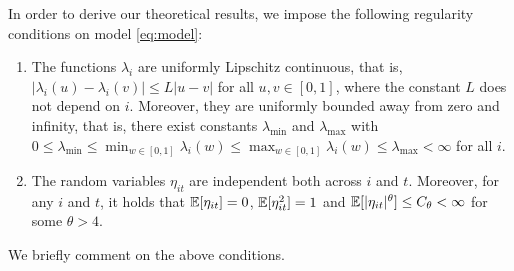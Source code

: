 \documentclass[a4paper,12pt]{article}
\numberwithin{equation}{section}
\begin{document}
In order to derive our theoretical results, we impose the following regularity conditions on model \eqref{eq:model}:
\begin{enumerate}[label=(C\arabic*),leftmargin=1.0cm]
\item \label{C2} The functions $\lambda_i$ are uniformly Lipschitz continuous, that is, $|\lambda_i(u) - \lambda_i(v)| \le L |u-v|$ for all $u, v \in [0,1]$, where the constant $L$ does not depend on $i$. Moreover, they are uniformly bounded away from zero and infinity, that is, there exist constants $\lambda_{\min}$ and $\lambda_{\max}$ with $0 \le \lambda_{\min} \le \min_{w \in [0,1]} \lambda_i(w) \le \max_{w \in [0,1]} \lambda_i(w) \le \lambda_{\max} < \infty$ for all $i$. 
\item \label{C1} The random variables $\eta_{it}$ are independent both across $i$ and $t$. Moreover, for any $i$ and $t$, it holds that $\mathbb{E}[\eta_{it}] = 0$, $\mathbb{E}[\eta_{it}^2] = 1$ and $\mathbb{E}[|\eta_{it}|^\theta] \le C_\theta < \infty$ for some $\theta > 4$. 
\end{enumerate}
We briefly comment on the above conditions. 
\end{document}
